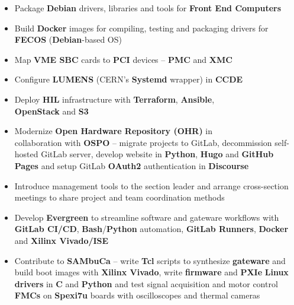\documentclass[10pt,a4paper,ragged2e,withhyper]{altacv}
\begin{document}


\makecvheader


\begin{paracol}{2}

\begin{itemize}
\item Package \textbf{Debian} drivers, libraries and tools for \textbf{Front End Computers}
\item Build \textbf{Docker} images for compiling, testing and packaging drivers for \textbf{FECOS} (\textbf{Debian}-based OS)
\item Map \textbf{VME SBC} cards to \textbf{PCI} devices -- \textbf{PMC} and \textbf{XMC}
\item Configure \textbf{LUMENS} (CERN's \textbf{Systemd} wrapper) in \textbf{CCDE}  
\item Deploy \textbf{HIL} infrastructure with \textbf{Terraform}, \textbf{Ansible}, \\ \textbf{OpenStack} and \textbf{S3}
\end{itemize}
\divider

\begin{itemize}
\item Modernize \textbf{Open Hardware Repository (OHR)} in \\ collaboration with \textbf{OSPO} -- migrate projects to GitLab, decommission self-hosted GitLab server, develop website in \textbf{Python}, \textbf{Hugo} and \textbf{GitHub Pages} and setup GitLab \textbf{OAuth2} authentication in \textbf{Discourse}
\item Introduce management tools to the section leader and arrange cross-section meetings to share project and team coordination methods
\item Develop \textbf{Evergreen} to streamline software and gateware workflows with \textbf{GitLab CI/CD}, \textbf{Bash}/\textbf{Python} automation, \textbf{GitLab Runners}, \textbf{Docker} and \textbf{Xilinx Vivado/ISE}
\item Contribute to \textbf{SAMbuCa} -- write \textbf{Tcl} scripts to synthesize \textbf{gateware} and build boot images with \textbf{Xilinx Vivado}, write \textbf{firmware} and \textbf{PXIe} \textbf{Linux drivers} in \textbf{C} and \textbf{Python} and test signal acquisition and motor control \textbf{FMCs} on \textbf{Spexi7u} boards with oscilloscopes and thermal cameras
\end{itemize}
\divider


\end{paracol}
\end{document}
